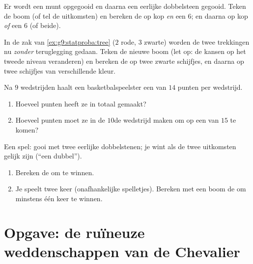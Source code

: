 \begin{exercise}[$\star\star$]\label{exo:g9:statproba:6}
Er wordt een munt opgegooid en daarna een eerlijke dobbelsteen gegooid. Teken de
boom (of tel de uitkomsten) en bereken de  op kop \emph{en} een $6$; en daarna
op kop \emph{of} een $6$ (of beide).
\end{exercise}

\begin{exercise}[$\star\star$]\label{exo:g9:statproba:7}
In de zak van \cref{ex:g9:statproba:tree} ($2$ rode, $3$ zwarte) worden de twee
trekkingen nu \emph{zonder} teruglegging gedaan. Teken de nieuwe boom (let op: de
kansen op het tweede niveau veranderen) en bereken de  op twee zwarte
schijfjes, en daarna op twee schijfjes van verschillende kleur.
\end{exercise}

\begin{exercise}[$\star\star$]\label{exo:g9:statproba:8}
Na $9$ wedstrijden haalt een basketbalspeelster een  van $14$ punten per
wedstrijd.
\begin{enumerate}
  \item Hoeveel punten heeft ze in totaal gemaakt?
  \item Hoeveel punten moet ze in de $10$de wedstrijd maken om op een 
        van $15$ te komen?
\end{enumerate}
\end{exercise}

\begin{exercise}[$\star\star\star$]\label{exo:g9:statproba:9}
Een spel: gooi met twee eerlijke dobbelstenen; je wint als de twee uitkomsten
gelijk zijn (``een dubbel'').
\begin{enumerate}
  \item Bereken de  om te winnen.
  \item Je speelt twee keer (onafhankelijke spelletjes). Bereken met een boom de
         om minstens één keer te winnen.
\end{enumerate}
\end{exercise}

\section{Opgave: de ruïneuze weddenschappen van de Chevalier}


